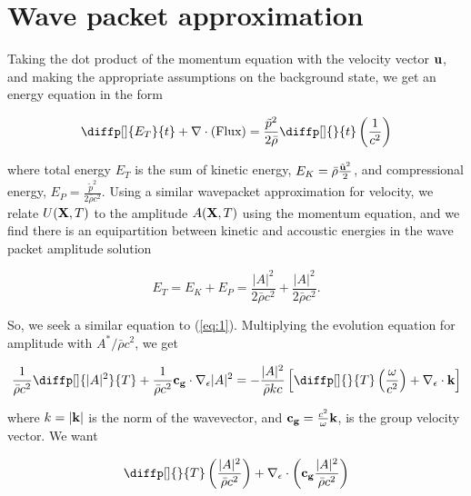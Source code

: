\subsectionfont{\fontsize{10}{10}\selectfont}

\graphicspath{{./assignment_03/figures/}}

\section{Wave packet approximation}%
\label{sec:wave_packet_approximation}

Taking the dot product of the momentum equation with the velocity vector ${\bf
u}$, and making the appropriate assumptions on the background state, we get an
energy equation in the form 

\begin{equation} \label{eq:1}
  \diffp[]{E_{T}}{t} + \nabla \cdot ( \text{Flux})
  = \frac{\tilde{p}^2}{2 \bar \rho } \diffp[]{}{t} \left( \frac{1}{c^2}\right)
\end{equation}

where total energy $E_{T}$ is the sum of kinetic energy, $ E_{K}=\bar \rho \frac{
\tilde{ {\bf u}}^2}{2}$, and compressional energy, $ E_{P}=\frac{\tilde{p}^2}{2 \bar
\rho c^2}$. Using a similar wavepacket approximation for velocity, we relate $U
( {\bf X}, T)$ to the amplitude $ A ( {\bf X}, T)$ using the momentum equation,
and we find there is an equipartition between kinetic and accoustic energies in
the wave packet amplitude solution

\[
  E_{T} = E_{K} + E_{P} =  \frac{| A|^2}{2 \bar \rho c^2} + \frac{| A|^2}{2 \bar \rho c^2}
.\] 

So, we seek a similar equation to (\ref{eq:1}). Multiplying the evolution
equation for amplitude with $A^{*}/ \bar \rho c^2$, we get

\begin{equation} \label{eq:2}
  \frac{1}{\bar \rho c^2} \diffp[]{|A|^2}{T} + \frac{1}{\bar \rho c^2} {\bf
  c_{g}} \cdot \nabla _{\epsilon }|A|^2 = -\frac{|A|^2}{\bar \rho kc} \left[
  \diffp[]{}{T} \left(\frac{\omega}{c^2}\right) + \nabla _{\epsilon } \cdot {\bf
  k} \right]
\end{equation}

where $k = | {\bf k}|$ is the norm of the wavevector, and ${\bf c_{g}}=
\frac{c^2}{\omega }{\bf k}$, is the group velocity vector. We want

\begin{equation} \label{eq:3}
  \diffp[]{}{T} \left( \frac{|A|^2}{\bar \rho c^2}\right) + \nabla _{\epsilon
  } \cdot \left( {\bf c_{g}} \frac{|A|^2}{\bar \rho c^2}\right)
\end{equation}

